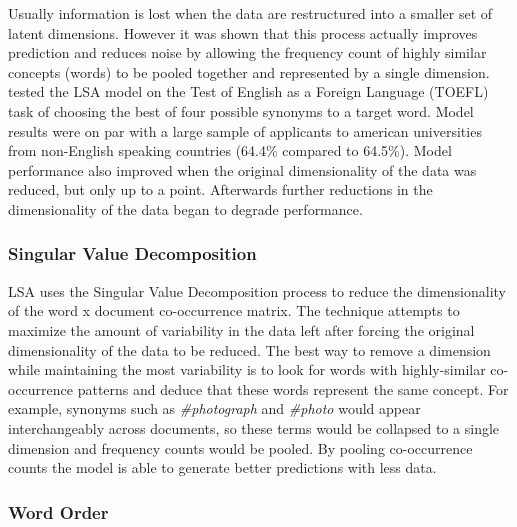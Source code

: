 \documentclass[man,floatsintext,donotrepeattitle]{apa6}
\begin{document}
Usually information is lost when the data are restructured into a smaller set of latent dimensions.
However it was shown that this process actually improves prediction and reduces noise by allowing the frequency count of highly similar concepts (words) to be pooled together and represented by a single dimension.
\textcite{Landauer1997} tested the LSA model on the Test of English as a Foreign Language (TOEFL) task of choosing the best of four possible synonyms to a target word.
Model results were on par with a large sample of applicants to american universities from non-English speaking countries (64.4\% compared to 64.5\%).
Model performance also improved when the original dimensionality of the data was reduced, but only up to a point.
Afterwards further reductions in the dimensionality of the data began to degrade performance.

\subsubsection{Singular Value Decomposition}

LSA uses the Singular Value Decomposition process to reduce the dimensionality of the word x document co-occurrence matrix.
The technique attempts to maximize the amount of variability in the data left after forcing the original dimensionality of the data to be reduced.
The best way to remove a dimension while maintaining the most variability is to look for words with highly-similar co-occurrence patterns and deduce that these words represent the same concept.
For example, synonyms such as \emph{\#photograph} and \emph{\#photo} would appear interchangeably across documents, so these terms would be collapsed to a single dimension and frequency counts would be pooled.
By pooling co-occurrence counts the model is able to generate better predictions with less data.

\subsubsection{Word Order}
\end{document}
